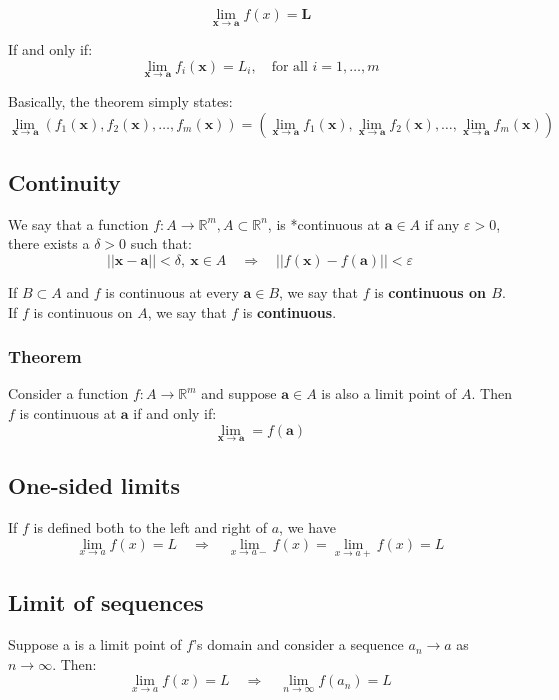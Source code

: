 \documentclass[11pt]{article}
\begin{document}
\[\lim_{\boldsymbol{x} \rightarrow \boldsymbol{a}} f(x) = \boldsymbol{L}\]

If and only if:
\[\lim_{\boldsymbol{x} \rightarrow \boldsymbol{a}} f_i (\boldsymbol{x}) = L_i, \quad \text{for all } i = 1, \ldots, m\]

Basically, the theorem simply states:
\[\lim_{\boldsymbol{x} \rightarrow \boldsymbol{a}} (f_1 (\boldsymbol{x}), f_2(\boldsymbol{x}), \ldots, f_m(\boldsymbol{x})) = \left(\lim_{\boldsymbol{x} \rightarrow \boldsymbol{a}} f_1(\boldsymbol{x}), \lim_{\boldsymbol{x} \rightarrow \boldsymbol{a}} f_2 (\boldsymbol{x}), \ldots, \lim_{\boldsymbol{x} \rightarrow \boldsymbol{a}} f_m (\boldsymbol{x}) \right)\]
\subsection{Continuity}
\label{sec:org5f5d395}
We say that a function \(f : A \rightarrow \mathbb{R}^m, A \subset \mathbb{R}^n\), is *continuous at \(\boldsymbol{a} \in A\) if any \(\varepsilon > 0\), there exists a \(\delta > 0\) such that:
\[||\boldsymbol{x} - \boldsymbol{a}|| < \delta, \ \boldsymbol{x} \in A \quad \Rightarrow \quad ||f(\boldsymbol{x}) - f(\boldsymbol{a})|| < \varepsilon\]

If \(B \subset A\) and \(f\) is continuous at every \(\boldsymbol{a} \in B\), we say that \(f\) is \textbf{continuous on \(B\)}. If \(f\) is continuous on \(A\), we say that \(f\) is \textbf{continuous}.
\subsubsection{Theorem}
\label{sec:orgcf66856}
Consider a function \(f : A \rightarrow \mathbb{R}^m\) and suppose \(\boldsymbol{a} \in A\) is also a limit point of \(A\). Then \(f\) is continuous at \(\boldsymbol{a}\) if and only if:
\[\lim_{\boldsymbol{x} \rightarrow \boldsymbol{a}} = f(\boldsymbol{a})\]
\subsection{One-sided limits}
\label{sec:orgcf0e6e0}
If \(f\) is defined both to the left and right of \(a\), we have
\[\lim_{x \rightarrow a} f(x) = L \quad \Rightarrow \quad \lim_{x \rightarrow a-} f(x) = \lim_{x \rightarrow a+} f(x) = L\]
\subsection{Limit of sequences}
\label{sec:org1cb93b2}
Suppose a is a limit point of \(f\)'s domain and consider a sequence \(a_n \rightarrow a\) as \(n \rightarrow \infty\). Then:
\[\lim_{x \rightarrow a} f(x) = L \quad \Rightarrow \quad \lim_{n \rightarrow \infty} f(a_n) = L\]
\end{document}
